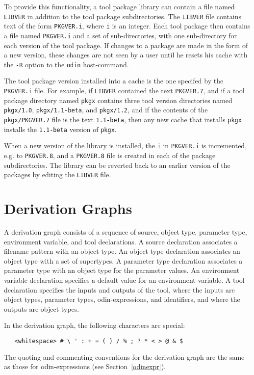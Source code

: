 \documentclass[hidelinks]{report}
\newcommand{\ex}{\tt}   %
\begin{document}
To provide this functionality,
a tool package library can contain a file named {\ex LIBVER}
in addition to the tool package subdirectories.
The {\ex LIBVER} file contains text of the form {\ex PKGVER.i},
where {\ex i} is an integer.
Each tool package then contains a file named {\ex PKGVER.i}
and a set of sub-directories,
with one sub-directory for each version of the tool package.
If changes to a package are made in the form of a new version,
these changes are not seen by a user until he resets his cache
with the {\ex -R} option to the {\ex odin} host-command.

The tool package version installed into a cache is
the one specifed by the {\ex PKGVER.i} file.
For example, if {\ex LIBVER} contained the text {\ex PKGVER.7},
and if a tool package directory named {\ex pkgx}
contains three tool version directories named {\ex pkgx/1.0},
{\ex pkgx/1.1-beta}, and {\ex pkgx/1.2},
and if the contents of the {\ex pkgx/PKGVER.7} file
is the text {\ex 1.1-beta},
then any new cache that installs {\ex pkgx} 
installs the {\ex 1.1-beta} version of {\ex pkgx}.

When a new version of the library is installed,
the {\ex i} in {\ex PKGVER.i} is incremented, e.g. to {\ex PKGVER.8},
and a {\ex PKGVER.8} file is created in each of the package subdirectories.
The library can be reverted back to an earlier version of the packages
by editing the {\ex LIBVER} file.


\section{Derivation Graphs}
\label{derivationgraph}

A derivation graph consists of a sequence of
source, object type, parameter type, environment variable,
and tool declarations.
A source declaration associates a filename pattern with an object type.
An object type declaration associates an object type with a set of
supertypes.
A parameter type declaration associates a parameter type with an object type
for the parameter values.
An environment variable declaration specifies a default value
for an environment variable.
A tool declaration specifies the inputs and outputs of the tool,
where the inputs are object types, parameter types, odin-expressions,
and identifiers, and where the outputs are object types.

In the derivation graph, the following characters are special:
\begin{verbatim}
   <whitespace> # \ ' : + = ( ) / % ; ? * < > @ & $
\end{verbatim}
The quoting and commenting conventions for the derivation graph are the same
as those for odin-expressions (see Section~\ref{odinexpr}).
\end{document}
